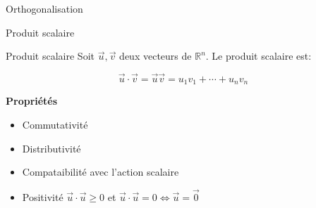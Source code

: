 \begin{parag}{Orthogonalisation}
    \begin{subparag}{Produit scalaire}
    \begin{definition}{Produit scalaire}
        Soit $\vec{u}, \vec{v}$ deux vecteurs de $\mathbb{R}^n$. Le produit scalaire est:
        \begin{formule}
            \[\vec{u}\cdot \vec{v} = \vec{u}\vec{v} = u_1v_1 + \cdots + u_nv_n\]
        \end{formule}
    \end{definition}
    \textbf{Propriétés}
    \begin{itemize}
        \item Commutativité
        \item Distributivité
        \item Compataibilité avec l'action scalaire
        \item Positivité $\vec{u}\cdot \vec{u} \geq 0$ et $\vec{u}\cdot \vec{u} = 0 \Leftrightarrow \vec{u} = \vec{0}$
    \end{itemize}
        

\end{subparag}
\end{parag}
